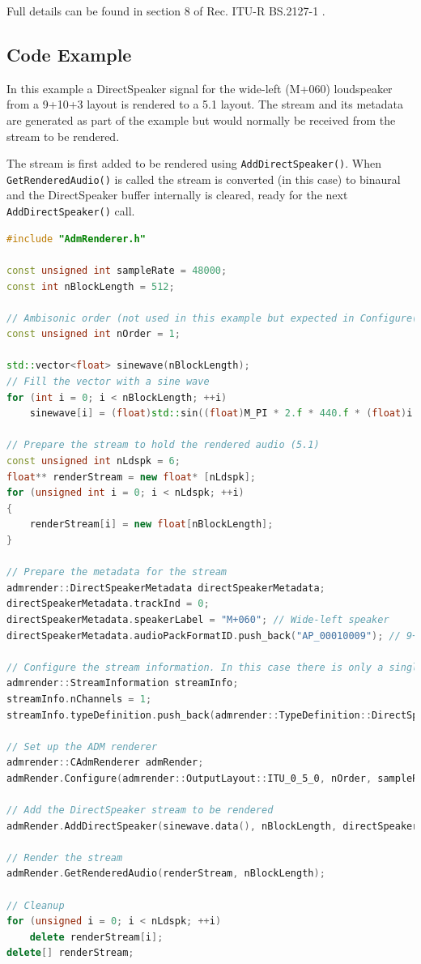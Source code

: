 \documentclass[12pt]{report}
\newcommand{\code}[1]{\texttt{#1}}
\begin{document}
Full details can be found in section 8 of Rec. ITU-R BS.2127-1 \cite{ITU2127}.

\subsection{Code Example}

In this example a DirectSpeaker signal for the wide-left (M+060) loudspeaker from a 9+10+3 layout is rendered to a 5.1 layout. The stream and its metadata are generated as part of the example but would normally be received from the stream to be rendered.

The stream is first added to be rendered using \code{AddDirectSpeaker()}. When \code{GetRenderedAudio()} is called the stream is converted (in this case) to binaural and the DirectSpeaker buffer internally is cleared, ready for the next \code{AddDirectSpeaker()} call.

\begin{lstlisting}[language=C++]
#include "AdmRenderer.h"

const unsigned int sampleRate = 48000;
const int nBlockLength = 512;

// Ambisonic order (not used in this example but expected in Configure())
const unsigned int nOrder = 1;

std::vector<float> sinewave(nBlockLength);
// Fill the vector with a sine wave
for (int i = 0; i < nBlockLength; ++i)
    sinewave[i] = (float)std::sin((float)M_PI * 2.f * 440.f * (float)i / (float)sampleRate);

// Prepare the stream to hold the rendered audio (5.1)
const unsigned int nLdspk = 6;
float** renderStream = new float* [nLdspk];
for (unsigned int i = 0; i < nLdspk; ++i)
{
    renderStream[i] = new float[nBlockLength];
}

// Prepare the metadata for the stream
admrender::DirectSpeakerMetadata directSpeakerMetadata;
directSpeakerMetadata.trackInd = 0;
directSpeakerMetadata.speakerLabel = "M+060"; // Wide-left speaker
directSpeakerMetadata.audioPackFormatID.push_back("AP_00010009"); // 9+10+3 layout

// Configure the stream information. In this case there is only a single channel stream
admrender::StreamInformation streamInfo;
streamInfo.nChannels = 1;
streamInfo.typeDefinition.push_back(admrender::TypeDefinition::DirectSpeakers);

// Set up the ADM renderer
admrender::CAdmRenderer admRender;
admRender.Configure(admrender::OutputLayout::ITU_0_5_0, nOrder, sampleRate, nBlockLength, streamInfo);

// Add the DirectSpeaker stream to be rendered
admRender.AddDirectSpeaker(sinewave.data(), nBlockLength, directSpeakerMetadata);

// Render the stream
admRender.GetRenderedAudio(renderStream, nBlockLength);

// Cleanup
for (unsigned i = 0; i < nLdspk; ++i)
    delete renderStream[i];
delete[] renderStream;
\end{lstlisting}
\end{document}
